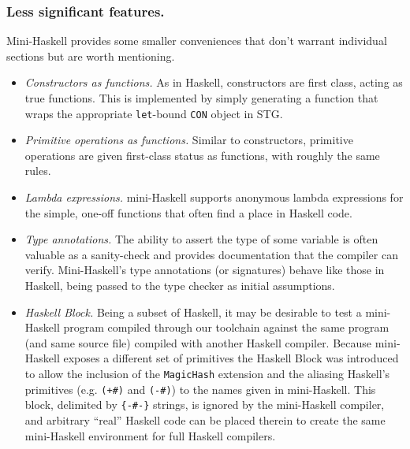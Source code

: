 \documentclass{llncs}
\begin{document}
\subsubsection{Less significant features.}

Mini-Haskell provides some smaller conveniences that don't warrant individual
sections but are worth mentioning.
\begin{itemize}
\item \emph{Constructors as functions.}
  As in Haskell, constructors are first class, acting as true functions.  This
  is implemented by simply generating a function that wraps the appropriate
  \texttt{let}-bound \texttt{CON} object in STG.  %

\item \emph{Primitive operations as functions.}
  Similar to constructors, primitive operations are given first-class status as
  functions, with roughly the same rules.  %

\item \emph{Lambda expressions.}
  mini-Haskell supports anonymous lambda expressions for the simple, one-off
  functions that often find a place in Haskell code.%

\item \emph{Type annotations.}  The ability to assert the type of some
  variable is often valuable as a sanity-check and provides documentation that
  the compiler can verify.  Mini-Haskell's type annotations (or signatures)
  behave like those in Haskell, being passed to the type checker as initial
  assumptions.

\item \emph{Haskell Block.}
  Being a subset of Haskell, it may be desirable to test a mini-Haskell program
  compiled through our toolchain against the same program (and same source file)
  compiled with another Haskell compiler.  Because mini-Haskell exposes a
  different set of primitives the Haskell Block was introduced to allow the
  inclusion of the \texttt{MagicHash} extension and the aliasing Haskell's
  primitives (e.g. \texttt{(+#)} and \texttt{(-#)}) to the names given in
  mini-Haskell.  This block, delimited by \texttt{\{-\#-\}} strings, is ignored
  by the mini-Haskell compiler, and arbitrary ``real'' Haskell code can be
  placed therein to create the same mini-Haskell environment for full Haskell
  compilers.

\end{itemize}
\end{document}
